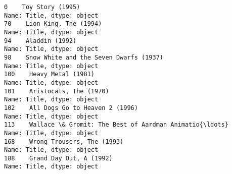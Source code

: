 \documentclass[11pt]{article}
\begin{document}
    \begin{Verbatim}[commandchars=\\\{\}]
0    Toy Story (1995)
Name: Title, dtype: object
70    Lion King, The (1994)
Name: Title, dtype: object
94    Aladdin (1992)
Name: Title, dtype: object
98    Snow White and the Seven Dwarfs (1937)
Name: Title, dtype: object
100    Heavy Metal (1981)
Name: Title, dtype: object
101    Aristocats, The (1970)
Name: Title, dtype: object
102    All Dogs Go to Heaven 2 (1996)
Name: Title, dtype: object
113    Wallace \& Gromit: The Best of Aardman Animatio{\ldots}
Name: Title, dtype: object
168    Wrong Trousers, The (1993)
Name: Title, dtype: object
188    Grand Day Out, A (1992)
Name: Title, dtype: object

    \end{Verbatim}

    \begin{center}
    \end{center}
    { \hspace*{\fill} \\}
    
    \begin{center}
    \end{center}
    { \hspace*{\fill} \\}
    
\end{document}
